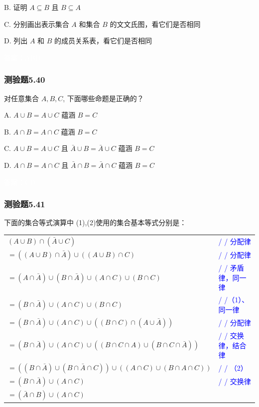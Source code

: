 \documentclass[UTF8, heading=true]{ctexart}
\begin{document}
B. 证明 $A \subseteq B$ 且 $B \subseteq A$

C. 分别画出表示集合 $A$ 和集合 $B$ 的文文氏图，看它们是否相同

D.  列出 $A$ 和 $B$ 的成员关系表，看它们是否相同

\textcolor{white}{答案：ABD}

\subsubsection{测验题5.40}
对任意集合 $A, B, C$, 下面哪些命题是正确的？

A. $ A \cup B=A \cup C$ 蕴涵 $B=C$

B. $A \cap B=A \cap C$ 蕴涵 $B=C$

C. $A \cup B=A \cup C$ 且 $\bar{A} \cup B=\bar{A} \cup C$ 蕴涵 $B=C$

D. $A \cap B=A \cap C$ 且 $\bar{A} \cap B=\bar{A} \cap C$ 蕴涵 $B=C$

\textcolor{white}{答案：CD}


\subsubsection{测验题5.41}
下面的集合等式演算中 (1),(2)使用的集合基本等式分别是：


\begin{table}[H]
  \centering
  \renewcommand{\arraystretch}{1.5}
  \begin{tabular}{ll}
    $(A \cup B) \cap (\bar{A} \cup C)$ & \textcolor{blue}{/ / 分配律} \\
    $=((A \cup B) \cap \bar{A}) \cup ((A \cup B) \cap C)$ & \textcolor{blue}{/ / 分配律} \\
    $=(A \cap \bar{A}) \cup (B \cap \bar{A}) \cup (A \cap C) \cup (B \cap C)$ & \textcolor{blue}{/ / 矛盾律，同一律} \\
    $=(B \cap \bar{A}) \cup (A \cap C) \cup (B \cap C)$ & \textcolor{blue}{/ /（1）、 同一律} \\
    $=(B \cap \bar{A}) \cup (A \cap C) \cup ((B \cap C) \cap (A \cup \bar{A}))$ & \textcolor{blue}{/ / 分配律} \\
    $=(B \cap \bar{A}) \cup (A \cap C) \cup ((B \cap C \cap A) \cup (B \cap C \cap \bar{A}))$ & \textcolor{blue}{/ / 交换律，结合律} \\
    $=((B \cap \bar{A}) \cup (B \cap \bar{A} \cap C)) \cup ((A \cap C) \cup (B \cap A \cap C))$ & \textcolor{blue}{/ / （2）} \\
    $=(B \cap \bar{A}) \cup (A \cap C)$ & \textcolor{blue}{/ / 交换律} \\
    $=(\bar{A} \cap B) \cup (A \cap C)$ & \\
  \end{tabular}
\end{table}
\end{document}
